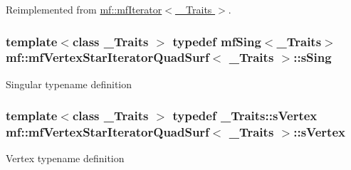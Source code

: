 Reimplemented from \hyperlink{classmf_1_1mfIterator_aca31e4d7e7eca4e3b100530d8725064b}{mf::mfIterator$<$ \_\-Traits $>$}.

\hypertarget{classmf_1_1mfVertexStarIteratorQuadSurf_a8e91ca9813a3b27d6db68c9eb403ad77}{
\subsubsection[{sSing}]{\setlength{\rightskip}{0pt plus 5cm}template$<$class \_\-Traits $>$ typedef {\bf mfSing}$<$\_\-Traits$>$ {\bf mf::mfVertexStarIteratorQuadSurf}$<$ \_\-Traits $>$::{\bf sSing}}}
\label{classmf_1_1mfVertexStarIteratorQuadSurf_a8e91ca9813a3b27d6db68c9eb403ad77}
Singular typename definition \hypertarget{classmf_1_1mfVertexStarIteratorQuadSurf_ab31908dfd0f8e27af019e03d3771c0b8}{
\subsubsection[{sVertex}]{\setlength{\rightskip}{0pt plus 5cm}template$<$class \_\-Traits $>$ typedef \_\-Traits::sVertex {\bf mf::mfVertexStarIteratorQuadSurf}$<$ \_\-Traits $>$::{\bf sVertex}}}
\label{classmf_1_1mfVertexStarIteratorQuadSurf_ab31908dfd0f8e27af019e03d3771c0b8}
Vertex typename definition 

